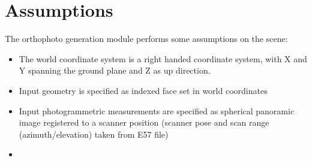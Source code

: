 \documentclass[11pt]{scrartcl}
\begin{document}
 
\section{Assumptions}

The orthophoto generation module performs some assumptions on the scene:

\begin{itemize}
	\item The world coordinate system is a right handed coordinate system, with X and Y spanning the ground plane and Z as up direction.
	\item Input geometry is specified as indexed face set in world coordinates
	\item Input photogrammetric measurements are specified as spherical panoramic image registered to a scanner position 
	(scanner pose and scan range (azimuth/elevation) taken from E57 file)
	\item 
\end{itemize}


 
\end{document}

